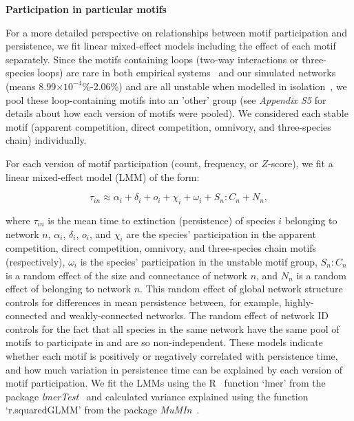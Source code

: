 \documentclass[12pt]{article}
\begin{document}
\begin{spacing}{2.0}
            \textbf{Participation in particular motifs}

                For a more detailed perspective on relationships between motif participation and persistence, we fit linear mixed-effect models including the effect of each motif separately.
                Since the motifs containing loops (two-way interactions or three-species loops) are rare in both empirical systems~\citep{StoufferXXXX} and our simulated networks (means 8.99$\times10^{-4}$\%-2.06\%) and are all unstable when modelled in isolation~\citep{BorrelliXXXX}, we pool these loop-containing motifs into an 'other' group (see \emph{Appendix S5} for details about how each version of motifs were pooled). 
                We considered each stable motif (apparent competition, direct competition, omnivory, and three-species chain) individually.


                For each version of motif participation (count, frequency, or $Z$-score), we fit a  linear mixed-effect model (LMM) of the form:

                \begin{equation}
                    \tau_{in} \approx \alpha_{i} + \delta_{i} + o_{i} + \chi_{i} + \omega_{i} + S_{n}:C_{n} +N_n,
                    \label{eq:persistence_motifs}
                \end{equation}

                where $\tau_{in}$ is the mean time to extinction (persistence) of species $i$ belonging to network $n$,  $\alpha_{i}$, $\delta_{i}$, $o_{i}$, and $\chi_{i}$ are the species' participation in the apparent competition, direct competition, omnivory, and three-species chain motifs (respectively), $\omega_{i}$ is the species' participation in the unstable motif group, $S_{n}:C_{n}$ is a random effect of the size and connectance of network $n$, and $N_n$ is a random effect of belonging to network $n$.
                This random effect of global network structure controls for differences in mean persistence between, for example, highly-connected and weakly-connected networks. 
                The random effect of network ID controls for the fact that all species in the same network have the same pool of motifs to participate in and are so non-independent.
                These models indicate whether each motif is positively or negatively correlated with persistence time, and how much variation in persistence time can be explained by each version of motif participation. 
                We fit the LMMs using the R~\citep{R} function `lmer' from the package \emph{lmerTest}~\citep{lmerTest} and calculated variance explained using the function `r.squaredGLMM' from the package \emph{MuMIn}~\citep{MuMIn}.
                

\end{spacing}
\end{document}
